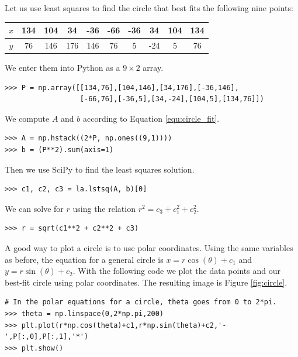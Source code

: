 Let us use least squares to find the circle that best fits the following nine points:
\begin{table}
\begin{tabular}{c||c|c|c|c|c|c|c|c|c}
$x$& 134  &104 &34  &-36  &-66  &-36  &34 &104 &  134  \\ \hline
$y$& 76&  146&  176&  146 &  76&  5& -24 & 5 & 76\\
\end{tabular}
\end{table}


We enter them into Python as a $9\times 2$ array.
\begin{lstlisting}
>>> P = np.array([[134,76],[104,146],[34,176],[-36,146],
                  [-66,76],[-36,5],[34,-24],[104,5],[134,76]])
\end{lstlisting}

We compute $A$ and $b$ according to Equation \ref{equ:circle_fit}.
\begin{lstlisting}
>>> A = np.hstack((2*P, np.ones((9,1))))
>>> b = (P**2).sum(axis=1)
\end{lstlisting}

Then we use SciPy to find the least squares solution.
\begin{lstlisting}
>>> c1, c2, c3 = la.lstsq(A, b)[0]
\end{lstlisting}

We can solve for $r$ using the relation $r^2 = c_3+c_1^2+c_2^2$.
\begin{lstlisting}
>>> r = sqrt(c1**2 + c2**2 + c3)
\end{lstlisting}

A good way to plot a circle is to use polar coordinates. 
Using the same variables as before, the equation for a general circle is $x=r\cos(\theta)+c_1$ and $y=r\sin(\theta)+c_2$. 
With the following code we plot the data points and our best-fit circle using polar coordinates. 
The resulting image is Figure \ref{fig:circle}.
\begin{lstlisting}
# In the polar equations for a circle, theta goes from 0 to 2*pi.
>>> theta = np.linspace(0,2*np.pi,200)
>>> plt.plot(r*np.cos(theta)+c1,r*np.sin(theta)+c2,'-',P[:,0],P[:,1],'*')
>>> plt.show()
\end{lstlisting}

